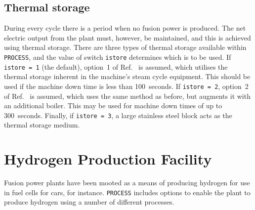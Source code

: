 \documentclass[11pt,a4paper]{report}
\newcommand{\process}{\mbox{\texttt{PROCESS}}}
\begin{document}
\subsection{Thermal storage}

During every cycle there is a period when no fusion power is produced. The net
electric output from the plant must, however, be maintained, and this is
achieved using thermal storage. There are three types of thermal storage
available within \process, and the value of switch \texttt{istore} determines
which is to be used. If \texttt{istore = 1} (the default), option~1 of
Ref.~\cite{ELECTROWATT} is assumed, which utilises the thermal storage
inherent in the machine's steam cycle equipment. This should be used if the
machine down time is less than 100~seconds. If \texttt{istore = 2}, option~2
of Ref.~\cite{ELECTROWATT} is assumed, which uses the same method as before,
but augments it with an additional boiler. This may be used for machine down
times of up to 300~seconds. Finally, if \texttt{istore = 3}, a large stainless
steel block acts as the thermal storage medium.

\section{Hydrogen Production Facility}

Fusion power plants have been mooted as a means of producing hydrogen for use
in fuel cells for cars, for instance. \process\/ includes options to enable
the plant to produce hydrogen using a number of different processes.
\end{document}
